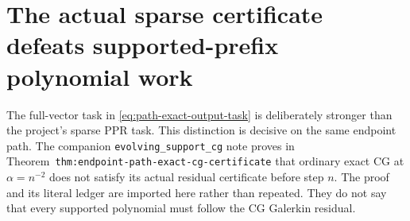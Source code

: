 \section{The actual sparse certificate defeats supported-prefix polynomial
work}
\label{sec:supported-prefix-certificate-counteralgorithm}

The full-vector task in \cref{eq:path-exact-output-task} is deliberately
stronger than the project's sparse PPR task.  This distinction is decisive on
the same endpoint path.  The companion
\texttt{evolving\_support\_cg} note proves in
Theorem~\texttt{thm:endpoint-path-exact-cg-certificate} that ordinary exact CG
at $\alpha=n^{-2}$ does not satisfy its actual residual certificate before
step $n$.  The proof and its literal ledger are imported here rather than
repeated.  They do not say that every supported polynomial must follow the CG
Galerkin residual.
